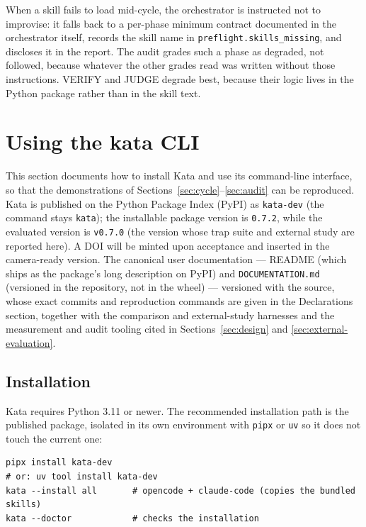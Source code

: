 \documentclass[11pt]{article}
\begin{document}
When a skill fails to load mid-cycle, the orchestrator is instructed not
to improvise: it falls back to a per-phase minimum contract documented in
the orchestrator itself, records the skill name in
\texttt{preflight.skills\_missing}, and discloses it in the report. The
audit grades such a phase as degraded, not followed, because whatever the
other grades read was written without those instructions. VERIFY and JUDGE
degrade best, because their logic lives in the Python package rather than
in the skill text.

\section{Using the kata CLI}
\label{sec:usage}

This section documents how to install Kata and use its command-line
interface, so that the demonstrations of
Sections~\ref{sec:cycle}--\ref{sec:audit} can be reproduced. Kata is
published on the Python Package Index (PyPI) as \texttt{kata-dev} (the
command stays \texttt{kata}); the installable package version is
\texttt{0.7.2}, while the evaluated version is \texttt{v0.7.0} (the
version whose trap suite and external study are reported here). A DOI will
be minted upon acceptance and inserted in the camera-ready version. The
canonical user documentation --- README (which ships as the package's long
description on PyPI) and \texttt{DOCUMENTATION.md} (versioned in the
repository, not in the wheel) ---
versioned with the source, whose exact commits and reproduction commands
are given in the Declarations section, together with the
comparison and external-study harnesses and the measurement and audit
tooling cited in Sections~\ref{sec:design} and \ref{sec:external-evaluation}.

\subsection{Installation}

Kata requires Python 3.11 or newer. The recommended installation path is
the published package, isolated in its own environment with
\texttt{pipx} or \texttt{uv} so it does not touch the current one:

\begin{lstlisting}
pipx install kata-dev
# or: uv tool install kata-dev
kata --install all       # opencode + claude-code (copies the bundled skills)
kata --doctor            # checks the installation
\end{lstlisting}
\end{document}
